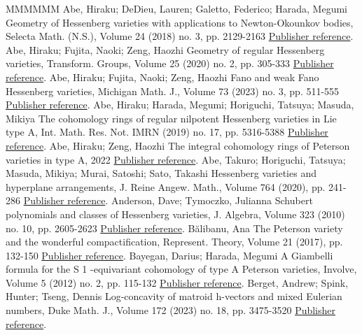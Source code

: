 \begin{thebibliography}{MMMMMM}
 Abe, Hiraku; DeDieu, Lauren; Galetto, Federico; Harada, Megumi Geometry of Hessenberg varieties with applications to Newton-Okounkov bodies, Selecta Math. (N.S.), Volume 24 (2018) no. 3, pp. 2129-2163 \href{https://alco.centre-mersenne.org/articles/10.5802/alco.342/#ab-de-ga-ha}{Publisher reference}.
 Abe, Hiraku; Fujita, Naoki; Zeng, Haozhi Geometry of regular Hessenberg varieties, Transform. Groups, Volume 25 (2020) no. 2, pp. 305-333 \href{https://alco.centre-mersenne.org/articles/10.5802/alco.342/#ab-fu-ze}{Publisher reference}.
 Abe, Hiraku; Fujita, Naoki; Zeng, Haozhi Fano and weak Fano Hessenberg varieties, Michigan Math. J., Volume 73 (2023) no. 3, pp. 511-555 \href{https://alco.centre-mersenne.org/articles/10.5802/alco.342/#ab-fu-ze2}{Publisher reference}.
 Abe, Hiraku; Harada, Megumi; Horiguchi, Tatsuya; Masuda, Mikiya The cohomology rings of regular nilpotent Hessenberg varieties in Lie type A, Int. Math. Res. Not. IMRN (2019) no. 17, pp. 5316-5388 \href{https://alco.centre-mersenne.org/articles/10.5802/alco.342/#AHHM}{Publisher reference}.
 Abe, Hiraku; Zeng, Haozhi The integral cohomology rings of Peterson varieties in type A, 2022 \href{https://alco.centre-mersenne.org/articles/10.5802/alco.342/#AZ}{Publisher reference}.
 Abe, Takuro; Horiguchi, Tatsuya; Masuda, Mikiya; Murai, Satoshi; Sato, Takashi Hessenberg varieties and hyperplane arrangements, J. Reine Angew. Math., Volume 764 (2020), pp. 241-286 \href{https://alco.centre-mersenne.org/articles/10.5802/alco.342/#AHMMS}{Publisher reference}.
 Anderson, Dave; Tymoczko, Julianna Schubert polynomials and classes of Hessenberg varieties, J. Algebra, Volume 323 (2010) no. 10, pp. 2605-2623 \href{https://alco.centre-mersenne.org/articles/10.5802/alco.342/#an-ty}{Publisher reference}.
 Bălibanu, Ana The Peterson variety and the wonderful compactification, Represent. Theory, Volume 21 (2017), pp. 132-150 \href{https://alco.centre-mersenne.org/articles/10.5802/alco.342/#Ba}{Publisher reference}.
 Bayegan, Darius; Harada, Megumi A Giambelli formula for the S 1 -equivariant cohomology of type A Peterson varieties, Involve, Volume 5 (2012) no. 2, pp. 115-132 \href{https://alco.centre-mersenne.org/articles/10.5802/alco.342/#BaHa}{Publisher reference}.
 Berget, Andrew; Spink, Hunter; Tseng, Dennis Log-concavity of matroid h-vectors and mixed Eulerian numbers, Duke Math. J., Volume 172 (2023) no. 18, pp. 3475-3520 \href{https://alco.centre-mersenne.org/articles/10.5802/alco.342/#Berget-Spink-Tseng}{Publisher reference}.

\end{thebibliography}
